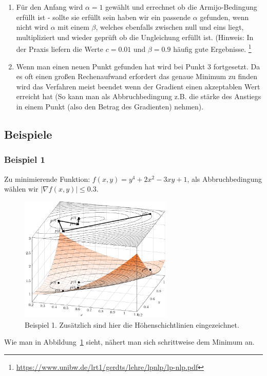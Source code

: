 \documentclass[naustrian]{article}
\begin{document}
{\begin{enumerate}
        $\varphi(\alpha) \leq \varphi(0) + c * \alpha^{[n]} * \varphi(0)'$.
        \\\\ Wobei $c$ eine Konstante zwischen null und eins ist und dazu
        dient das die Bedingung nicht zu restriktiv ist, $\varphi(\alpha) = f(P^{[n]} + \alpha^{[n]}s^{[n]})$
        und $\varphi(0)' = {\nabla}f(P^{n}) * s^{[n]}$
    \item Für den Anfang wird $\alpha=1$ gewählt und errechnet ob die Armijo-Bedingung
        erfüllt ist - sollte sie erfüllt sein haben wir ein passende $\alpha$
        gefunden, wenn nicht wird $\alpha$ mit einem $\beta$, welches ebenfalls
        zwischen null und eins liegt, multipliziert und wieder geprüft ob
        die Ungleichung erfüllt ist. (Hinweis: In der Praxis liefern die Werte
        $c = 0.01$ und $\beta = 0.9$ häufig gute Ergebnisse.
        \footnote{\href{https://www.unibw.de/lrt1/gerdts/lehre/lpnlp/lp-nlp.pdf}{https://www.unibw.de/lrt1/gerdts/lehre/lpnlp/lp-nlp.pdf}}
    \item Wenn man einen neuen Punkt gefunden hat wird bei Punkt 3 fortgesetzt.
        Da es oft einen großen Rechenaufwand erfordert das genaue Minimum
        zu finden wird das Verfahren meist beendet wenn der Gradient einen
        akzeptablen Wert erreicht hat (So kann man als Abbruchbedingung z.B.
        die stärke des Anstiegs in einem Punkt (also den Betrag des Gradienten)
        nehmen).
\end{enumerate}

\subsection{Beispiele}
\subsubsection{Beispiel 1}
Zu minimierende Funktion: $f(x,y)=y^4+2x^2-3xy+1$, als Abbruchbedingung wählen
wir $|{\nabla}f(x,y)| \leq 0.3$.

\begin{figure}[h]
    \centering
    \includegraphics[width=0.65\textwidth]{grad/figure1}
    \caption{Beispiel 1. Zusätzlich sind hier die Höhenschichtlinien eingezeichnet.}
    \label{bsp1}
\end{figure}
Wie man in Abbildung~\ref{bsp1} sieht, nähert man sich schrittweise dem
Minimum an.

}
\end{document}
